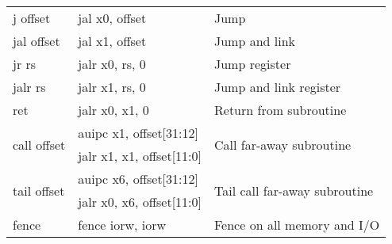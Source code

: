 \begin{tabular}{| l | l | l |}
\hline
{\ttfamily j offset} & {\ttfamily jal x0, offset} & Jump \\
{\ttfamily jal offset} & {\ttfamily jal x1, offset} & Jump and link \\
{\ttfamily jr rs} & {\ttfamily jalr x0, rs, 0} & Jump register \\
{\ttfamily jalr rs} & {\ttfamily jalr x1, rs, 0} & Jump and link register \\
{\ttfamily ret} & {\ttfamily jalr x0, x1, 0} & Return from subroutine \\
\multirow{2}{*}{\ttfamily call offset} & {\ttfamily auipc x1, offset[31:12]} & \multirow{2}{*}{Call far-away subroutine} \\
                                 & {\ttfamily jalr x1, x1, offset[11:0]} & \\
\multirow{2}{*}{\ttfamily tail offset} & {\ttfamily auipc x6, offset[31:12]} & \multirow{2}{*}{Tail call far-away subroutine} \\
                                 & {\ttfamily jalr x0, x6, offset[11:0]} & \\
\hline
{\ttfamily fence} & {\ttfamily fence iorw, iorw} & Fence on all memory and I/O \\
\hline

\end{tabular}